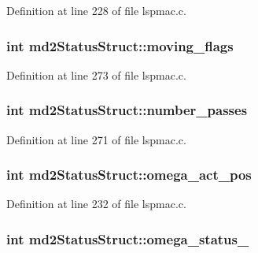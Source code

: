 Definition at line 228 of file lspmac.c.\hypertarget{structmd2StatusStruct_aac82f8e97fa39ea9be7823dd1d308986}{
\subsubsection[{moving\_\-flags}]{\setlength{\rightskip}{0pt plus 5cm}int {\bf md2StatusStruct::moving\_\-flags}}}
\label{structmd2StatusStruct_aac82f8e97fa39ea9be7823dd1d308986}


Definition at line 273 of file lspmac.c.\hypertarget{structmd2StatusStruct_ab3da523bad7b82c1d27780caa24a8b92}{
\subsubsection[{number\_\-passes}]{\setlength{\rightskip}{0pt plus 5cm}int {\bf md2StatusStruct::number\_\-passes}}}
\label{structmd2StatusStruct_ab3da523bad7b82c1d27780caa24a8b92}


Definition at line 271 of file lspmac.c.\hypertarget{structmd2StatusStruct_a6ce303bec89082cae1e9b1fddf6b6c10}{
\subsubsection[{omega\_\-act\_\-pos}]{\setlength{\rightskip}{0pt plus 5cm}int {\bf md2StatusStruct::omega\_\-act\_\-pos}}}
\label{structmd2StatusStruct_a6ce303bec89082cae1e9b1fddf6b6c10}


Definition at line 232 of file lspmac.c.\hypertarget{structmd2StatusStruct_af6cf3cd65b9ef205685a0d970f168907}{
\subsubsection[{omega\_\-status\_\-1}]{\setlength{\rightskip}{0pt plus 5cm}int {\bf md2StatusStruct::omega\_\-status\_}}}
\label{structmd2StatusStruct_af6cf3cd65b9ef205685a0d970f168907}


